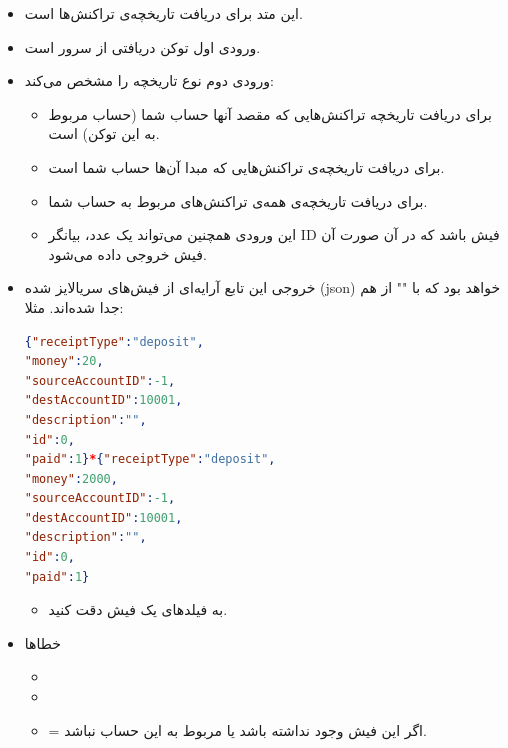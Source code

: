 \documentclass[]{article}
\begin{document}
\begin{itemize}

\item
این متد برای دریافت تاریخچه‌ی تراکنش‌ها است.
\item
\textcolor{CustomColor}{ورودی} اول توکن دریافتی از سرور است.
\item
\textcolor{CustomColor}{ورودی} دوم نوع تاریخچه را مشخص می‌کند:

\begin{itemize}
\item
{}  برای دریافت تاریخچه تراکنش‌هایی که مقصد آنها حساب شما (حساب مربوط به این توکن) است.
\item
{}  برای دریافت تاریخچه‌ی تراکنش‌هایی که مبدا آن‌ها حساب شما است.
\item
{}  برای دریافت تاریخچه‌ی همه‌ی تراکنش‌های مربوط به حساب شما.
\item
این ورودی همچنین می‌تواند یک عدد، بیانگر ID فیش باشد که در آن صورت آن فیش خروجی داده می‌شود.
\end{itemize}

\item
\textcolor{CustomColor}{خروجی} این تابع آرایه‌ای از فیش‌های سریالایز شده (json) خواهد بود که با "\lr{*}" از هم جدا شده‌اند. مثلا:




\begin{latin}

\begin{lstlisting}[language = json , numbers = none]
{"receiptType":"deposit",
"money":20,
"sourceAccountID":-1,
"destAccountID":10001,
"description":"",
"id":0,
"paid":1}*{"receiptType":"deposit",
"money":2000,
"sourceAccountID":-1,
"destAccountID":10001,
"description":"",
"id":0,
"paid":1}
\end{lstlisting}

\end{latin}

\begin{itemize}[label = $\star$]

\item
به فیلدهای یک فیش دقت کنید.	

\end{itemize}

\item
\textcolor{CustomColor}{خطاها}
\begin{itemize}
\item
{}

\item
{}

\item
{} = اگر این فیش وجود نداشته باشد یا مربوط به این حساب نباشد.


\end{itemize}

\end{itemize}
\end{document}

